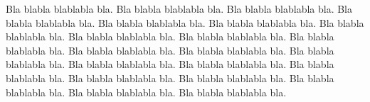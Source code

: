 \documentclass[diss,capa]{texufpel}
\begin{document}
Bla blabla blablabla bla.  Bla blabla blablabla bla.  Bla blabla
blablabla bla.  Bla blabla blablabla bla.  Bla blabla blablabla bla.
Bla blabla blablabla bla.  Bla blabla blablabla bla.  Bla blabla
blablabla bla.  Bla blabla blablabla bla.  Bla blabla blablabla bla.
Bla blabla blablabla bla.  Bla blabla blablabla bla.  Bla blabla
blablabla bla.  Bla blabla blablabla bla.  Bla blabla blablabla bla.
Bla blabla blablabla bla.  Bla blabla blablabla bla.  Bla blabla
blablabla bla.  Bla blabla blablabla bla.  Bla blabla blablabla bla.
Bla blabla blablabla bla.

\end{document}
